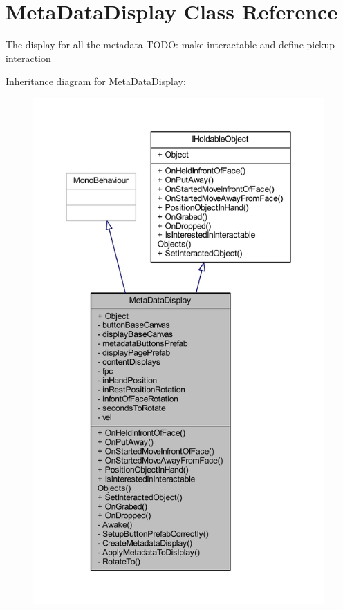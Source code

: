 \hypertarget{class_meta_data_display}{}\section{Meta\+Data\+Display Class Reference}
\label{class_meta_data_display}


The display for all the metadata T\+O\+DO\+: make interactable and define pickup interaction  




Inheritance diagram for Meta\+Data\+Display\+:\nopagebreak
\begin{figure}[H]
\begin{center}
\leavevmode
\includegraphics[height=550pt]{class_meta_data_display__inherit__graph}
\end{center}
\end{figure}


